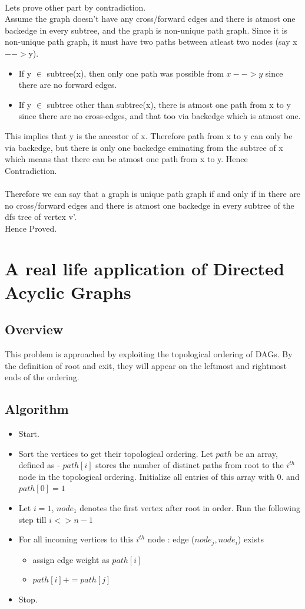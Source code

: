 \documentclass{article}
\begin{document}
\\
Lets prove other part by contradiction.\\
Assume the graph doesn't have any cross/forward edges and there is atmost one backedge in every subtree, and the graph is non-unique path graph. Since it is non-unique path graph, it must have two paths between atleast two nodes (say x$-->$y). 
\begin{itemize}
\item If y $\in$ subtree(x), then only one path was possible from $x-->y$ since there are no forward edges.
\item If y $\in$ subtree other than subtree(x), there is atmost one path from x to y since there are no cross-edges, and that too via backedge which is atmost one.
\end{itemize}
This implies that y is the ancestor of x. Therefore path from x to y can only be via backedge, but there is only one backedge eminating from the subtree of x which means that there can be atmost one path from x to y. Hence Contradiction.\\
\\
Therefore we can say that a graph is unique path graph if and only if in there are no cross/forward edges and there is atmost one backedge in every subtree of the dfs tree of vertex v'.\\
Hence Proved.

\newpage
\section{A real life application of Directed Acyclic Graphs}
\subsection{Overview}
This problem is approached by exploiting the topological ordering of DAGs. By the definition of root and exit, they will appear on the leftmost and rightmost ends of the ordering.
\subsection{Algorithm}
\begin{itemize}
\item Start.
\item Sort the vertices to get their topological ordering. Let $path$ be an array, defined as - $path[i]$ stores the number of distinct paths from root to the $i^{th}$ node in the topological ordering. Initialize all entries of this array with $0$. and $path[0] = 1$
\item Let $i=1$, $node_1$ denotes the first vertex after root in order. Run the following step till $i <> n-1$
\item For all incoming vertices to this $i^{th}$ node : edge ($node_j, node_i$) exists
\begin{itemize}
\item assign edge weight as $path[i]$
\item $path[i] += path[j]$
\end{itemize} 
\item Stop.
\end{itemize}
\end{document}
